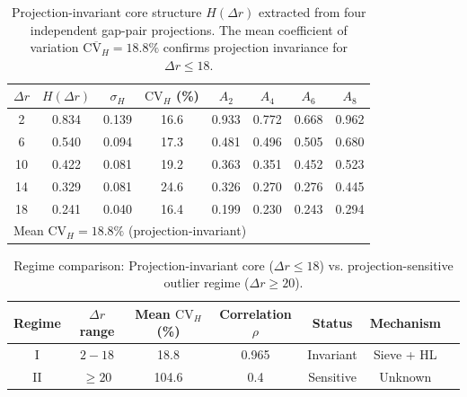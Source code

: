 
\begin{table}[h]
\centering
\caption{Projection-invariant core structure $H(\Delta r)$ extracted from four independent gap-pair projections. The mean coefficient of variation $\overline{\text{CV}_H} = 18.8\%$ confirms projection invariance for $\Delta r \le 18$.}
\label{tab:H_extraction}
\begin{tabular}{cccccccc}
\hline
\hline
$\Delta r$ & $H(\Delta r)$ & $\sigma_H$ & $\text{CV}_H$ (\%) & $A_2$ & $A_4$ & $A_6$ & $A_8$ \\
\hline
2  & 0.834 & 0.139 & 16.6 & 0.933 & 0.772 & 0.668 & 0.962 \\
6  & 0.540 & 0.094 & 17.3 & 0.481 & 0.496 & 0.505 & 0.680 \\
10 & 0.422 & 0.081 & 19.2 & 0.363 & 0.351 & 0.452 & 0.523 \\
14 & 0.329 & 0.081 & 24.6 & 0.326 & 0.270 & 0.276 & 0.445 \\
18 & 0.241 & 0.040 & 16.4 & 0.199 & 0.230 & 0.243 & 0.294 \\
\hline
\multicolumn{8}{l}{Mean $\text{CV}_H = 18.8\%$ (projection-invariant)} \\
\hline
\hline
\end{tabular}
\end{table}

%
%

\begin{table}[h]
\centering
\caption{Regime comparison: Projection-invariant core ($\Delta r \le 18$) vs. projection-sensitive outlier regime ($\Delta r \ge 20$).}
\label{tab:regime_comparison}
\begin{tabular}{ccccccc}
\hline
\hline
Regime & $\Delta r$ range & Mean $\text{CV}_H$ (\%) & Correlation $\rho$ & Status & Mechanism \\
\hline
I  & $2-18$  & 18.8 & 0.965 & Invariant & Sieve + HL \\
II & $\ge 20$ & 104.6 & 0.4  & Sensitive & Unknown \\
\hline
\hline
\end{tabular}
\end{table}

%
